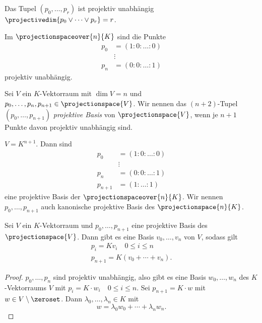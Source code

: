 \begin{bemerkungen*}
  Das Tupel \( (p_0,\dotsc,p_r) \) ist projektiv unabhängig \gdw \( \projectivedim{p_0\vee \dotsb\vee p_r}=r \).
\end{bemerkungen*}
\begin{beispiel*}
  Im \( \projectionspaceover{n}{K} \) sind die Punkte
  \begin{align*}
    p_0&=(1:0:\dotsc:0)\\
    &\vdots\\
    p_n&=(0:0:\dotsc:1)
  \end{align*}
  projektiv unabhängig.
\end{beispiel*}
\begin{definition*}
  Sei \( V \) ein \( K \)-Vektorraum mit \( \dim{V}=n \) und \( p_0,\dotsc,p_n,p_{n+1}\in \projectionspace{V} \). Wir nennen das \( (n+2) \)-Tupel \( (p_0,\dotsc,p_{n+1}) \) \emph{projektive Basis} von \( \projectionspace{V} \), wenn je \( n+1 \) Punkte davon projektiv unabhängig sind.
\end{definition*}
\begin{beispiel*}
  \( V=K^{n+1} \). Dann sind
  \begin{align*}
    p_0&=(1:0:\dotsc:0)\\
    &\vdots\\
    p_n&=(0:0:\dotsc:1)\\
    p_{n+1}&=(1:\dotsc:1)
  \end{align*}
  eine projektive Basis der \( \projectionspaceover{n}{K} \). Wir nennen \( p_0,\dotsc,p_{n+1}  \) auch kanonische projektive Basis des \( \projectionspace{n}{K} \).
\end{beispiel*}
\begin{lemma}\label{kanonische_projektive_basis_klappt}
  Sei \( V \) ein \( K \)-Vektorraum und \( p_0,\dotsc,p_{n+1} \) eine projektive Basis des \( \projectionspace{V} \). Dann gibt es eine Basis \( v_0,\dots,v_n \) von \( V \), sodass gilt
  \begin{gather*}
    p_i=Kv_i\quad 0\leq i\leq n\\
    p_{n+1}=K(v_0+\dotsb+v_n).
  \end{gather*}
\end{lemma}
\begin{proof}
  \( p_0,\dotsc,p_n \) sind projektiv unabhängig, also gibt es eine Basis \( w_0,\dotsc,w_n \) des \( K \)-Vektorraums \( V \) mit \( p_i=K\cdot w_i \quad 0\leq i\leq n\). Sei \( p_{n+1}=K\cdot w \) mit \( w\in V\setminus\zeroset \). Dann \texists \( \lambda_0,\dotsc,\lambda_n\in K \) mit 
  \begin{equation*}
    w=\lambda_0 w_0+\dotsb+\lambda_n w_n.
  \end{equation*}
\end{proof}
